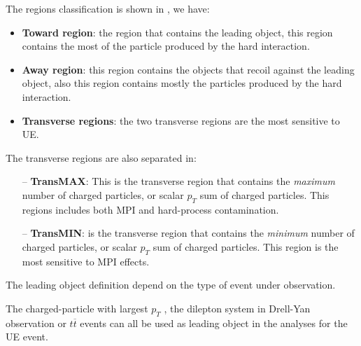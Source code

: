 The regions classification is shown in , we have:
\begin{itemize}
	\item \textbf{Toward region}: the region that contains the leading object, this region contains the most of the particle produced by the hard interaction.
	\item \textbf{Away region}: this region contains the objects that recoil against the leading object, also this region contains mostly the particles produced by the hard interaction.
	\item \textbf{Transverse regions}: the two transverse regions are the most sensitive to UE.
\end{itemize}
The transverse regions are also separated in:
\begin{itemize}
	\item[--] \textbf{TransMAX}: This is the transverse region that contains the \textit{maximum} number of charged particles, or scalar $p_T$ sum of charged particles. This regions includes both MPI and hard-process contamination.
	\item[--] \textbf{TransMIN}: is the transverse region that contains the \textit{minimum} number of charged particles, or scalar $p_T$ sum of charged particles. This region is the most  sensitive to MPI effects.
\end{itemize}

The leading object definition depend on the type of event under observation. 

The charged-particle with largest $p_T$ \cite{CMS-PAS-FSQ-15-007}, the dilepton system in Drell-Yan observation \cite{CMS:2012oqb, CMS:2017ngy} or $t\overline{t}$ events \cite{CMS:2018mdd} can all be used as leading object in the analyses for the UE event.


